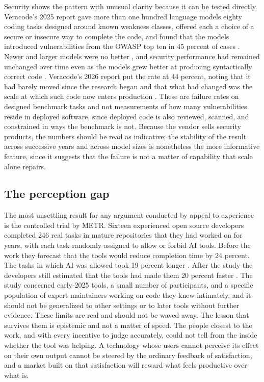 \documentclass[11pt,a4paper]{article}
\theoremstyle{remark}
\begin{document}
Security shows the pattern with unusual clarity because it can be tested directly. Veracode's 2025 report gave more than one hundred language models eighty coding tasks designed around known weakness classes, offered each a choice of a secure or insecure way to complete the code, and found that the models introduced vulnerabilities from the OWASP top ten in 45 percent of cases \cite{Veracode2025}. Newer and larger models were no better \cite{TechRadar2025}, and security performance had remained unchanged over time even as the models grew better at producing syntactically correct code \cite{Veracode2025}. Veracode's 2026 report put the rate at 44 percent, noting that it had barely moved since the research began and that what had changed was the scale at which such code now enters production \cite{Veracode2026}. These are failure rates on designed benchmark tasks and not measurements of how many vulnerabilities reside in deployed software, since deployed code is also reviewed, scanned, and constrained in ways the benchmark is not. Because the vendor sells security products, the numbers should be read as indicative; the stability of the result across successive years and across model sizes is nonetheless the more informative feature, since it suggests that the failure is not a matter of capability that scale alone repairs.

\subsection{The perception gap}

The most unsettling result for any argument conducted by appeal to experience is the controlled trial by METR. Sixteen experienced open source developers completed 246 real tasks in mature repositories that they had worked on for years, with each task randomly assigned to allow or forbid AI tools. Before the work they forecast that the tools would reduce completion time by 24 percent. The tasks in which AI was allowed took 19 percent longer \cite{Becker2025}. After the study the developers still estimated that the tools had made them 20 percent faster \cite{METR2025}. The study concerned early-2025 tools, a small number of participants, and a specific population of expert maintainers working on code they knew intimately, and it should not be generalized to other settings or to later tools without further evidence. These limits are real and should not be waved away. The lesson that survives them is epistemic and not a matter of speed. The people closest to the work, and with every incentive to judge accurately, could not tell from the inside whether the tool was helping. A technology whose users cannot perceive its effect on their own output cannot be steered by the ordinary feedback of satisfaction, and a market built on that satisfaction will reward what feels productive over what is.
\end{document}
